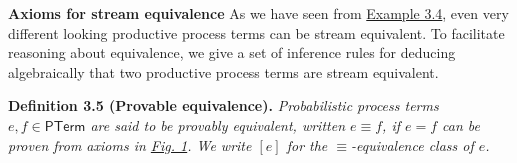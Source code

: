 \documentclass[11pt,a4paper]{amsart}
\begin{document}
\par\medskip
\hypertarget{html:S3.SS0.SSS0.Px2}{} \par\noindent\textbf{Axioms for stream equivalence}\quad  %
\hypertarget{html:S3.SS0.SSS0.Px2.p1}{} As we have seen from \hyperlink{html:S3.Thmtheorem4}{Example 3.4}, even very different looking productive process terms can be stream equivalent. To facilitate reasoning about equivalence, we give a set of inference rules for deducing algebraically that two productive process terms are stream equivalent.
\par\medskip
\hypertarget{html:S3.Thmtheorem5}{} \par\noindent\textbf{\textbf{Definition 3.5}\textbf{ }(Provable equivalence)\textbf{.}}\quad  %
\hypertarget{html:S3.Thmtheorem5.p1}{} \emph{Probabilistic process terms %
\hypertarget{html:S3.Thmtheorem5.p1.m1}{}\({e,f\in\mathsf{PTerm}}\) are said to be \emph{provably equivalent}, written %
\hypertarget{html:S3.Thmtheorem5.p1.m2}{}\({e\equiv f}\), if %
\hypertarget{html:S3.Thmtheorem5.p1.m3}{}\({e=f}\) can be proven from axioms in \hyperlink{html:S3.F1}{Fig. 1}. We write %
\hypertarget{html:S3.Thmtheorem5.p1.m4}{}\({[e]}\) for the %
\hypertarget{html:S3.Thmtheorem5.p1.m5}{}\({\equiv}\)-equivalence class of %
\hypertarget{html:S3.Thmtheorem5.p1.m6}{}\({e}\).}
\par\medskip
\hypertarget{html:S3.F1}{}
\end{document}
